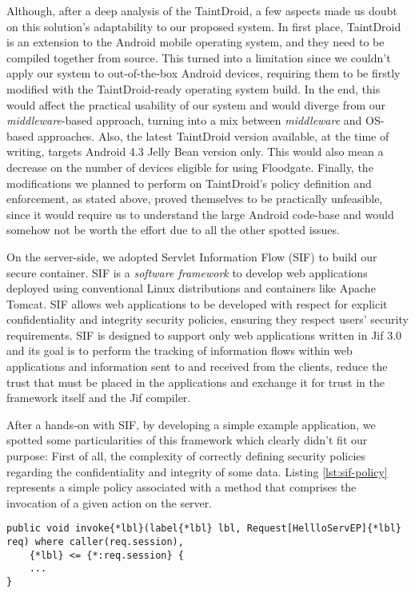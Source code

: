 Although, after a deep analysis of the TaintDroid, a few aspects made us doubt on this solution's adaptability to our proposed system. In first place, TaintDroid is an extension to the Android mobile operating system, and they need to be compiled together from source. This turned into a limitation since we couldn't apply our system to out-of-the-box Android devices, requiring them to be firstly modified with the TaintDroid-ready operating system build. In the end, this would affect the practical usability of our system and would diverge from our \textit{middleware}-based approach, turning into a mix between \textit{middleware} and OS-based approaches. Also, the latest TaintDroid version available, at the time of writing, targets Android 4.3 Jelly Bean version only. This would also mean a decrease on the number of devices eligible for using Floodgate. Finally, the modifications we planned to perform on TaintDroid's policy definition and enforcement, as stated above, proved themselves to be practically unfeasible, since it would require us to understand the large Android code-base and would somehow not be worth the effort due to all the other spotted issues.

On the server-side, we adopted Servlet Information Flow (SIF) \cite{sif} to build our secure container. SIF is a \textit{software framework} to develop web applications deployed using conventional Linux distributions and containers like Apache Tomcat. SIF allows web applications to be developed with respect for explicit confidentiality and integrity security policies, ensuring they respect users' security requirements. SIF is designed to support only web applications written in Jif 3.0 \cite{jif} and its goal is to perform the tracking of information flows within web applications and information sent to and received from the clients, reduce the trust that must be placed in the applications and exchange it for trust in the framework itself and the Jif compiler.

After a hands-on with SIF, by developing a simple example application, we spotted some particularities of this framework which clearly didn't fit our purpose: First of all, the complexity of correctly defining security policies regarding the confidentiality and integrity of some data. Listing \ref{lst:sif-policy} represents a simple policy associated with a method that comprises the invocation of a given action on the server.

\begin{lstlisting}[caption=SIF security policy example, label=lst:sif-policy]
public void invoke{*lbl}(label{*lbl} lbl, Request[HellloServEP]{*lbl} req) where caller(req.session),
    {*lbl} <= {*:req.session} {
	...
}
\end{lstlisting}


